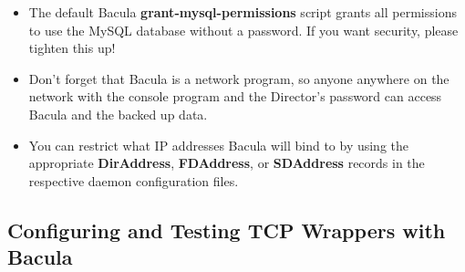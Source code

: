 \begin{itemize}
   {\bf root} permission. 
\item The default Bacula {\bf grant-mysql-permissions} script  grants all
   permissions to use the MySQL database without a  password. If you want
   security, please tighten this up! 
\item Don't forget that Bacula is a network program, so anyone anywhere  on
   the network with the console program and the Director's password  can access
   Bacula and the backed up data. 
\item You can restrict what IP addresses Bacula will bind to by using the 
   appropriate {\bf DirAddress}, {\bf FDAddress}, or {\bf SDAddress}  records in
   the respective daemon configuration files. 
\end{itemize}

\label{wrappers}

\subsection*{Configuring and Testing TCP Wrappers with Bacula}

